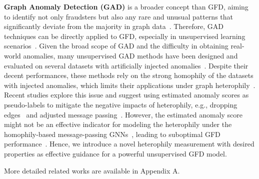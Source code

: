 \noindent \textbf{Graph Anomaly Detection (GAD)} is a broader concept than GFD, aiming to identify not only fraudsters but also any rare and unusual patterns that significantly deviate from the majority in graph data~\cite{ding2019deep, zheng2021heterogeneous,wang2024unifying,liu2024arc,cai2024lgfgad,cai2022plad,zhang2024deep,liu2024towards}. Therefore, GAD techniques can be directly applied to GFD, especially in unsupervised learning scenarios~\cite{li2024noise,liu2024self}. Given the broad scope of GAD and the difficulty in obtaining real-world anomalies, many unsupervised GAD methods have been designed and evaluated on several datasets with artificially injected anomalies~\cite{ding2019deep, liu2021anomaly, jin2021anemone, zheng2021generative, duan2023graph, duan2023arise, pan2023prem}.
Despite their decent performances, these methods rely on the strong homophily of the datasets with injected anomalies, which limits their applications under graph heterophily~\cite{zheng2022graph, zheng2023finding}. Recent studies explore this issue and suggest using estimated anomaly scores as pseudo-labels to mitigate the negative impacts of heterophily, e.g., dropping edges~\cite{he2024ada, qiao2024truncated} and adjusted message passing~\cite{chen2024boosting}. 
However, the estimated anomaly score might not be an effective indicator for modeling the heterophily under the homophily-based message-passing GNNs~\cite{zhu2022does}, leading to suboptimal GFD performance~\cite{GLOD}.
Hence, we introduce a novel heterophily measurement with desired properties as effective guidance for a powerful unsupervised GFD model.

More detailed related works are available in Appendix A.